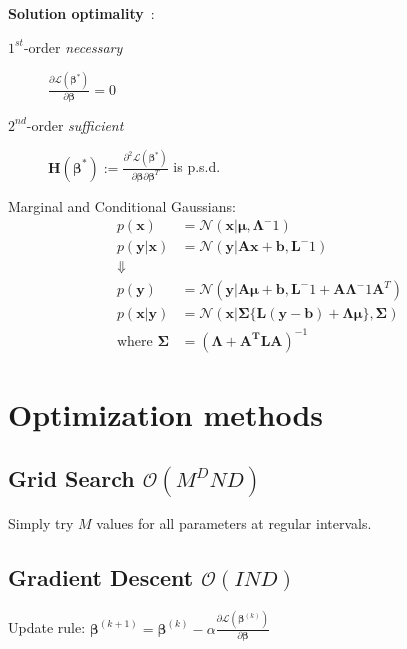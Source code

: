 \documentclass[10pt,a4paper,landscape]{article}
\renewcommand{\bf}[1]{\ensuremath{\mathbf{#1}}}
\newcommand{\bbeta}{\boldsymbol\beta}
\newcommand{\psd}{p.s.d.}
\begin{document}
\begin{multicols*}{4}

\textbf{Solution optimality}~:
\begin{description}
\item[$1^{st}$-order \textit{necessary}] $\frac{\partial\mathcal{L}(\bf{\bbeta}^*)}{\partial\bbeta} = 0$
\item[$2^{nd}$-order \textit{sufficient}] $\bf{H}(\bf{\bbeta}^*) := \frac{\partial^2\mathcal{L}(\bbeta^*)}{\partial\bbeta\partial\bbeta^T}$ is \psd
\end{description}



Marginal and Conditional Gaussians:
$$
\begin{aligned}
p(\bf{x}) &= \mathcal{N}(\bf{x} | \boldsymbol\mu, \boldsymbol\Lambda^-1) \\
p(\bf{y}|\bf{x}) &= \mathcal{N}(\bf{y} | \bf{Ax + b, L}^-1) \\
\Downarrow \\
p(\bf{y}) &= \mathcal{N}(\bf{y} | \bf{A} \boldsymbol\mu + \bf{b}, \bf{L}^-1 + \bf{A} \boldsymbol\Lambda^-1 \bf{A}^T)	\\
p(\bf{x}|\bf{y}) &= \mathcal{N}(\bf{x} |\boldsymbol\Sigma \{ \bf{L(y - b) + \Lambda \mu} \}, \boldsymbol\Sigma) \\
\text{where } \boldsymbol\Sigma &= (\boldsymbol\Lambda + \bf{A^T L A})^{-1}
\end{aligned}
$$

\section{Optimization methods}

\subsection{Grid Search \small$\mathcal{O}(M^D N D)$}
Simply try $M$ values for all parameters at regular intervals.

\subsection{Gradient Descent \small$\mathcal{O}(I N D)$}
Update rule: $\bbeta^{(k+1)} = \bbeta^{(k)} - \alpha \frac{\partial \mathcal{L}(\bbeta^{(k)})}{\partial \bbeta}$



\end{multicols*}
\end{document}
